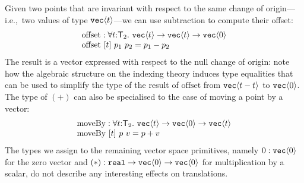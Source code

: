 \documentclass{sigplanconf}
\newcommand{\SynTransl}[1]{\mathsf{T}_#1}
\newcommand{\tyPrim}[2]{\textup{\texttt{#1}}\langle #2 \rangle}
\newcommand{\tyPrimNm}[1]{\textup{\texttt{#1}}}
\theoremstyle{examplestyle}
\theoremstyle{restatementstyle}
\newcommand{\fixme}[1]{\textbf{FIXME: #1}}
\begin{document}
Given two points that are invariant with respect to the same change of
origin---i.e.,~two values of type $\tyPrim{vec}{t}$---we can use
subtraction to compute their offset:
\begin{displaymath}
  \begin{array}{l}
    \mathrm{offset} : \forall t
    \mathord:\SynTransl{2}.\ \tyPrim{vec}{t} \to \tyPrim{vec}{t} \to
    \tyPrim{vec}{0} \\ \mathrm{offset}\ [t]\ p_1\ p_2 = p_1 - p_2
  \end{array}
\end{displaymath}
The result is a vector expressed with respect to the null change of
origin: note how the algebraic structure on the indexing theory
induces type equalities that can be used to simplify the type of the
result of $\mathrm{offset}$ from $\tyPrim{vec}{t-t}$ to
$\tyPrim{vec}{0}$. The type of $(+)$ can also be specialised to the
case of moving a point by a vector:
\begin{displaymath}
  \begin{array}{l}
    \mathrm{moveBy} : \forall t
    \mathord:\SynTransl{2}.\ \tyPrim{vec}{t} \to \tyPrim{vec}{0} \to
    \tyPrim{vec}{t} \\ \mathrm{moveBy}\ [t]\ p\ v = p + v
  \end{array}
\end{displaymath}
The types we assign to the remaining vector space primitives, namely
$\mathrm{0} : \tyPrim{vec}{0}$ for
the zero vector and $(*) : \tyPrimNm{real} \to
    \tyPrim{vec}{0} \to \tyPrim{vec}{0}$ for
multiplication by a scalar, do not describe any
interesting effects on translations.

\end{document}
